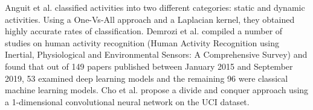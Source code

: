 Anguit et al. \cite{Anguita2012}  classified activities into two different categories:  static and dynamic activities.
Using a One-Vs-All approach and a Laplacian kernel, they obtained highly accurate rates of classification.
Demrozi et al. \cite{Demrozi2020} compiled a number of studies on human activity recognition (Human Activity Recognition using Inertial, Physiological and Environmental Sensors: A Comprehensive Survey) and found that out of 149 papers published between January 2015 and September 2019, 53 examined deep learning models and the remaining 96 were classical machine learning models.
Cho et al. \cite{Cho2018} propose a divide and conquer approach using a 1-dimensional convolutional neural network on the UCI dataset.